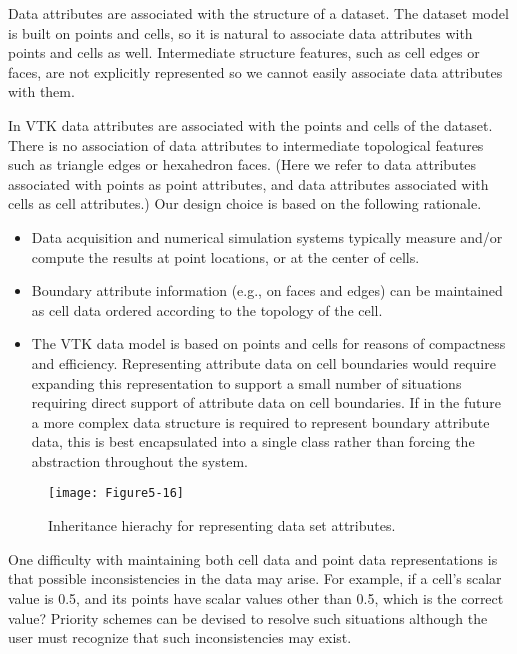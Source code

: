 Data attributes are associated with the structure of a dataset. The dataset model is built on points and cells, so it is natural to associate data attributes with points and cells as well. Intermediate structure features, such as cell edges or faces, are not explicitly represented so we cannot easily associate data attributes with them.

In VTK data attributes are associated with the points and cells of the dataset. There is no association of data attributes to intermediate topological features such as triangle edges or hexahedron faces. (Here we refer to data attributes associated with points as point attributes, and data attributes associated with cells as cell attributes.) Our design choice is based on the following rationale.

\begin{itemize}

	\item Data acquisition and numerical simulation systems typically measure and/or compute the results at point locations, or at the center of cells.

	\item Boundary attribute information (e.g., on faces and edges) can be maintained as cell data ordered according to the topology of the cell.

	\item The VTK data model is based on points and cells for reasons of compactness and efficiency. Representing attribute data on cell boundaries would require expanding this representation to support a small number of situations requiring direct support of attribute data on cell boundaries. If in the future a more complex data structure is required to represent boundary attribute data, this is best encapsulated into a single class rather than forcing the abstraction throughout the system.

\end{itemize}
\begin{figure}[!htb]
	\centering
	\texttt{[image: Figure5-16]}
	\caption{Inheritance hierachy for representing data set attributes.}
	\label{fig:Figure5-16}
\end{figure}

One difficulty with maintaining both cell data and point data representations is that possible inconsistencies in the data may arise. For example, if a cell’s scalar value is 0.5, and its points have scalar values other than 0.5, which is the correct value? Priority schemes can be devised to resolve such situations although the user must recognize that such inconsistencies may exist.

